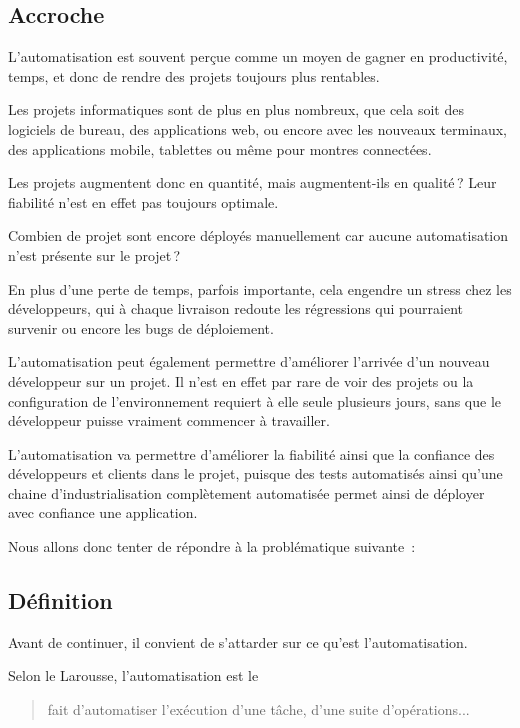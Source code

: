 \subsection{Accroche}
L'automatisation est souvent perçue comme un moyen de gagner en productivité, temps, et donc de rendre des projets toujours plus rentables.
	
Les projets informatiques sont de plus en plus nombreux, que cela soit des logiciels de bureau, des applications web, ou encore avec les nouveaux terminaux, des applications mobile, tablettes ou même pour montres connectées.
	
Les projets augmentent donc en quantité, mais augmentent-ils en qualité ? Leur fiabilité n'est en effet pas toujours optimale.
	
Combien de projet sont encore déployés manuellement car aucune automatisation n'est présente sur le projet ? 
	
En plus d'une perte de temps, parfois importante, cela engendre un stress chez les développeurs, qui à chaque livraison redoute les régressions qui pourraient survenir ou encore les bugs de déploiement.

L'automatisation peut également permettre d'améliorer l'arrivée d'un nouveau développeur sur un projet. Il n'est en effet par rare de voir des projets ou la configuration de l'environnement requiert à elle seule plusieurs jours, sans que le développeur puisse vraiment commencer à travailler.
	
L'automatisation va permettre d'améliorer la fiabilité ainsi que la confiance des développeurs et clients dans le projet, puisque des tests automatisés ainsi qu'une chaine d'industrialisation complètement automatisée permet ainsi de déployer avec confiance une application.
	
Nous allons donc tenter de répondre à la problématique suivante :

	
{\LARGE \problematique}

\subsection{Définition}

Avant de continuer, il convient de s'attarder sur ce qu'est l'automatisation.

Selon le Larousse, l'automatisation est le 

\begin{quote}
fait d'automatiser l'exécution d'une tâche, d'une suite d'opérations...
\end{quote}

